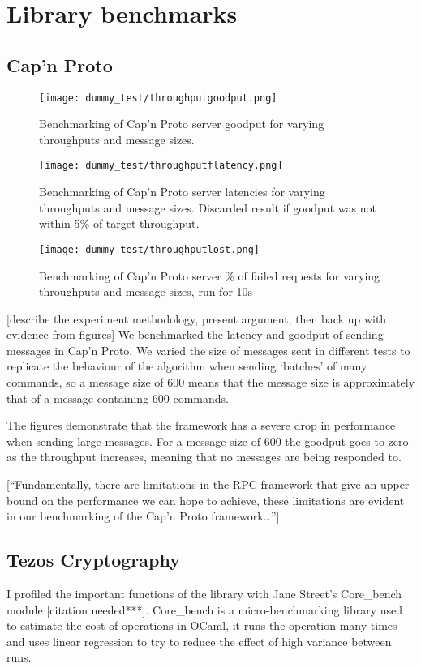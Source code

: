 \section{Library benchmarks} \label{librarybenchmarks}
\subsection{Cap'n Proto} \label{capnpbenchmark}

\begin{figure}[h!]
\centering
\texttt{[image: dummy\_test/throughputgoodput.png]}
\caption{Benchmarking of Cap'n Proto server goodput for varying throughputs and message sizes.}
\end{figure}

\begin{figure}[h!]
\centering
\texttt{[image: dummy\_test/throughputflatency.png]}
\caption{Benchmarking of Cap'n Proto server latencies for varying throughputs and message sizes. Discarded result if goodput was not within 5\% of target throughput.}
\end{figure}

\begin{figure}[h!]
\centering
\texttt{[image: dummy\_test/throughputlost.png]}
\caption{Benchmarking of Cap'n Proto server \% of failed requests for varying throughputs and message sizes, run for 10s}
\end{figure}

[describe the experiment methodology, present argument, then back up with evidence from figures]
We benchmarked the latency and goodput of sending messages in Cap'n Proto. We varied the size of messages sent in different tests to replicate the behaviour of the algorithm when sending `batches' of many commands, so a message size of 600 means that the message size is approximately that of a message containing 600 commands.

The figures demonstrate that the framework has a severe drop in performance when sending large messages. For a message size of 600 the goodput goes to zero as the throughput increases, meaning that no messages are being responded to.

[``Fundamentally, there are limitations in the RPC framework that give an upper bound on the performance we can hope to achieve, these limitations are evident in our benchmarking of the Cap'n Proto framework\dots'']

\subsection{Tezos Cryptography} \label{tezosbenchmark}
I profiled the important functions of the library with Jane Street's Core\_bench module [citation needed***]. Core\_bench is a micro-benchmarking library used to estimate the cost of operations in OCaml, it runs the operation many times and uses linear regression to try to reduce the effect of high variance between runs.

